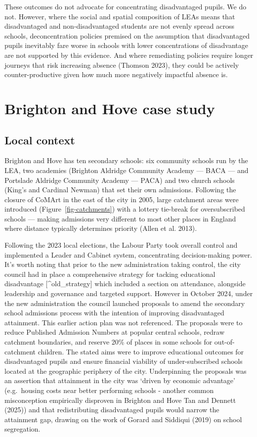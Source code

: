 \documentclass[
  12pt,
  titlepage]{article}
\begin{document}
These outcomes do not advocate for concentrating disadvantaged pupils.
We do not. However, where the social and spatial composition of LEAs
means that disadvantaged and non-disadvantaged students are not evenly
spread across schools, deconcentration policies premised on the
assumption that disadvantaged pupils inevitably fare worse in schools
with lower concentrations of disadvantage are not supported by this
evidence. And where remediating policies require longer journeys that
risk increasing absence (Thomson 2023), they could be actively
counter-productive given how much more negatively impactful absence is.

\section{Brighton and Hove case
study}\label{brighton-and-hove-case-study}

\subsection{Local context}\label{local-context}

Brighton and Hove has ten secondary schools: six community schools run
by the LEA, two academies (Brighton Aldridge Community Academy --- BACA
--- and Portslade Aldridge Community Academy --- PACA) and two church
schools (King's and Cardinal Newman) that set their own admissions.
Following the closure of CoMArt in the east of the city in 2005, large
catchment areas were introduced (Figure~\ref{fig-catchments}) with a
lottery tie-break for oversubscribed schools --- making admissions very
different to most other places in England where distance typically
determines priority (Allen et al. 2013).

Following the 2023 local elections, the Labour Party took overall
control and implemented a Leader and Cabinet system, concentrating
decision-making power. It's worth noting that prior to the new
administration taking control, the city council had in place a
comprehensive strategy for tacking educational disadvantage
{[}\^{}old\_strategy{]} which included a section on attendance,
alongside leadership and governance and targeted support. However in
October 2024, under the new administration the council launched
proposals to amend the secondary school admissions process with the
intention of improving disadvantaged attainment. This earlier action
plan was not referenced. The proposals were to reduce Published
Admission Numbers at popular central schools, redraw catchment
boundaries, and reserve 20\% of places in some schools for
out-of-catchment children. The stated aims were to improve educational
outcomes for disadvantaged pupils and ensure financial viability of
under-subscribed schools located at the geographic periphery of the
city. Underpinning the proposals was an assertion that attainment in the
city was `driven by economic advantage' (e.g.~housing costs near better
performing schools - another common misconception empirically disproven
in Brighton and Hove Tan and Dennett (2025)) and that redistributing
disadvantaged pupils would narrow the attainment gap, drawing on the
work of Gorard and Siddiqui (2019) on school segregation.
\end{document}
